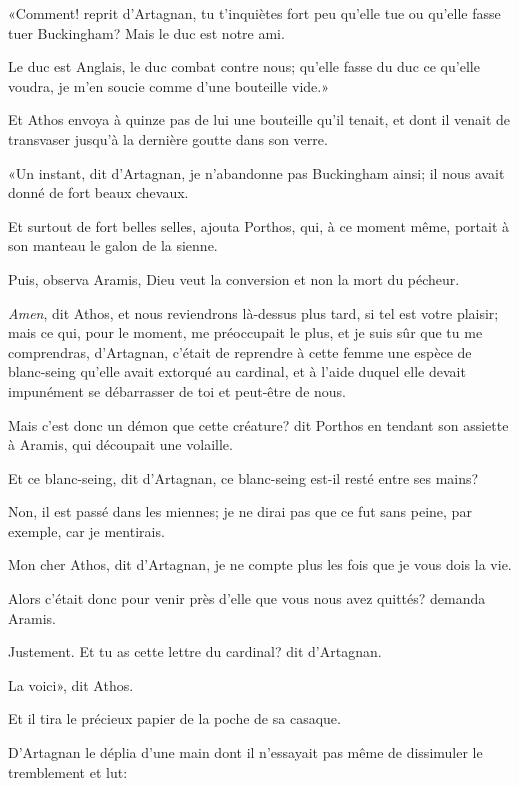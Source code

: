 «Comment! reprit d'Artagnan, tu t'inquiètes fort peu qu'elle tue ou qu'elle fasse tuer Buckingham? Mais le duc est notre ami. 

\speak  Le duc est Anglais, le duc combat contre nous; qu'elle fasse du duc ce qu'elle voudra, je m'en soucie comme d'une bouteille vide.» 

Et Athos envoya à quinze pas de lui une bouteille qu'il tenait, et dont il venait de transvaser jusqu'à la dernière goutte dans son verre. 

«Un instant, dit d'Artagnan, je n'abandonne pas Buckingham ainsi; il nous avait donné de fort beaux chevaux. 

\speak  Et surtout de fort belles selles, ajouta Porthos, qui, à ce moment même, portait à son manteau le galon de la sienne. 

\speak  Puis, observa Aramis, Dieu veut la conversion et non la mort du pécheur. 

\speak  \textit{Amen}, dit Athos, et nous reviendrons là-dessus plus tard, si tel est votre plaisir; mais ce qui, pour le moment, me préoccupait le plus, et je suis sûr que tu me comprendras, d'Artagnan, c'était de reprendre à cette femme une espèce de blanc-seing qu'elle avait extorqué au cardinal, et à l'aide duquel elle devait impunément se débarrasser de toi et peut-être de nous. 

\speak  Mais c'est donc un démon que cette créature? dit Porthos en tendant son assiette à Aramis, qui découpait une volaille. 

\speak  Et ce blanc-seing, dit d'Artagnan, ce blanc-seing est-il resté entre ses mains? 

\speak  Non, il est passé dans les miennes; je ne dirai pas que ce fut sans peine, par exemple, car je mentirais. 

\speak  Mon cher Athos, dit d'Artagnan, je ne compte plus les fois que je vous dois la vie. 

\speak  Alors c'était donc pour venir près d'elle que vous nous avez quittés? demanda Aramis. 

\speak  Justement. Et tu as cette lettre du cardinal? dit d'Artagnan. 

\speak  La voici», dit Athos. 

Et il tira le précieux papier de la poche de sa casaque. 

D'Artagnan le déplia d'une main dont il n'essayait pas même de dissimuler le tremblement et lut: 

\begin{a4}
	\vspace{-0.5cm}
	\enlargethispage{\baselineskip}
\end{a4}

